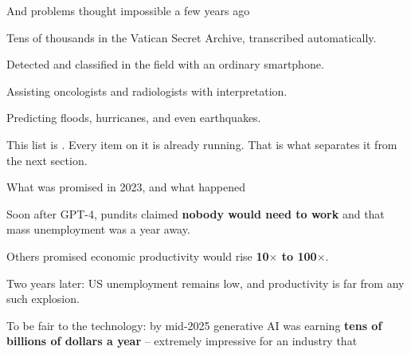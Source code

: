 \documentclass[aspectratio=169,11pt,t]{beamer}
\begin{document}
\begin{frame}[shrink=25]{And problems thought impossible a few years ago}
\begin{minipage}[t]{0.241\textwidth}
\begin{icardgood}
Tens of thousands in the Vatican Secret Archive, transcribed automatically.
\end{icardgood}
\end{minipage}%
\hfill
\begin{minipage}[t]{0.241\textwidth}
\begin{icardgood}
Detected and classified in the field with an ordinary smartphone.
\end{icardgood}
\end{minipage}%
\hfill
\begin{minipage}[t]{0.241\textwidth}
\begin{icardgood}
Assisting oncologists and radiologists with interpretation.
\end{icardgood}
\end{minipage}%
\hfill
\begin{minipage}[t]{0.241\textwidth}
\begin{icardgood}
Predicting floods, hurricanes, and even earthquakes.
\end{icardgood}
\end{minipage}%
\begin{iband}[signal]
This list is . Every item on it is already running. That is what separates it from the next section.
\end{iband}
\end{frame}


\begin{frame}[shrink=25]{What was promised in 2023, and what happened}
\begin{ibullets}
\item Soon after GPT-4, pundits claimed \textbf{nobody would need to work} and that mass unemployment was a year away.
\item Others promised economic productivity would rise \textbf{10$\times$ to 100$\times$}.
\item Two years later: US unemployment remains low, and productivity is far from any such explosion.
\end{ibullets}
\begin{iband}[signal]
To be fair to the technology: by mid-2025 generative AI was earning \textbf{tens of billions of dollars a year} -- extremely impressive for an industry that 
\end{iband}
\end{frame}
\end{document}
